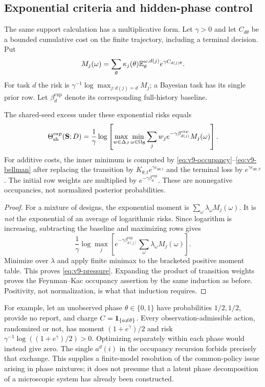 \subsection{Exponential criteria and hidden-phase control}
The same support calculation has a multiplicative form. Let $\gamma>0$
and let $C_{d\theta}$ be a bounded cumulative cost on the finite
trajectory, including a terminal decision. Put
\[
 M_j(\omega)=\sum_\theta\kappa_j(\theta)
                       \mathbb E_\theta^{\omega,d(j)}e^{\gamma C_{d(j)\theta}}.
\]
For task $d$ the risk is $\gamma^{-1}\log\max_{j:d(j)=d}M_j$;
a Bayesian task has its single prior row. Let $\beta_d^{\exp}$ denote
its corresponding full-history baseline.
\begin{corollary}
\label{cor:v9-pressure}
The shared-seed excess under these exponential risks equals
\begin{equation}
 \Theta^{\exp}_{\rm sh}({\bf S};D)
 =\frac1\gamma\log\left[
   \max_{w\in\Delta_J}\min_{\omega\in\Omega_{\bf S}}
       \sum_jw_j e^{-\gamma\beta_{d(j)}^{\exp}}M_j(\omega)\right].
 \label{eq:v9-pressure}
\end{equation}
For additive costs, the inner minimum is computed by
\eqref{eq:v9-occupancy}--\eqref{eq:v9-bellman} after replacing the
transition by $K_{\theta,t}e^{\gamma c_{d\theta,t}}$ and the terminal
loss by $e^{\gamma c_{d\theta,T}}$. The initial row weights are multiplied
by $e^{-\gamma\beta_d^{\exp}}$. These are nonnegative occupancies,
not normalized posterior probabilities.
\end{corollary}
\begin{proof}
For a mixture of designs, the exponential moment is
$\sum_\omega\lambda_\omega M_j(\omega)$. It is \emph{not} the exponential
of an average of logarithmic risks. Since logarithm is increasing,
subtracting the baseline and maximizing rows gives
\[
 \frac1\gamma\log\max_j
       \left[e^{-\gamma\beta_{d(j)}^{\exp}}
                      \sum_\omega\lambda_\omega M_j(\omega)\right].
\]
Minimize over $\lambda$ and apply finite minimax to the bracketed
positive moment table. This proves \eqref{eq:v9-pressure}.
Expanding the product of transition weights proves the Feynman--Kac
occupancy assertion by the same induction as before. Positivity, not
normalization, is what that induction requires.
\end{proof}

For example, let an unobserved phase $\theta\in\{0,1\}$ have probabilities
$1/2,1/2$, provide no report, and charge $C=\mathbf 1_{\{a\ne\theta\}}$.
Every observation-admissible action, randomized or not, has moment
$(1+e^\gamma)/2$ and risk
$\gamma^{-1}\log((1+e^\gamma)/2)>0$. Optimizing separately within each
phase would instead give zero. The single $a^d(i)$ in the occupancy
recursion forbids precisely that exchange. This supplies a finite-model
resolution of the common-policy issue arising in phase mixtures; it does
not presume that a latent phase decomposition of a microscopic system
has already been constructed.
